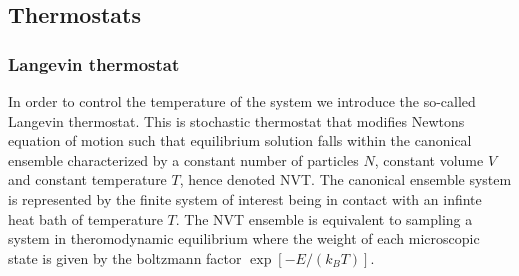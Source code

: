 

\subsection{Thermostats}

\subsubsection*{Langevin thermostat}


In order to control the temperature of the system we introduce the so-called Langevin thermostat. This is stochastic thermostat that modifies Newtons equation of motion such that equilibrium solution falls within the canonical ensemble characterized by a constant number of particles $N$, constant volume $V$ and constant temperature $T$, hence denoted NVT. The canonical ensemble system is represented by the finite system of interest being in contact with an infinte heat bath of temperature $T$. The NVT ensemble is equivalent to sampling a system in theromodynamic equilibrium where the weight of each microscopic state is given by the boltzmann factor $\exp[-E/(k_B T)]$.

